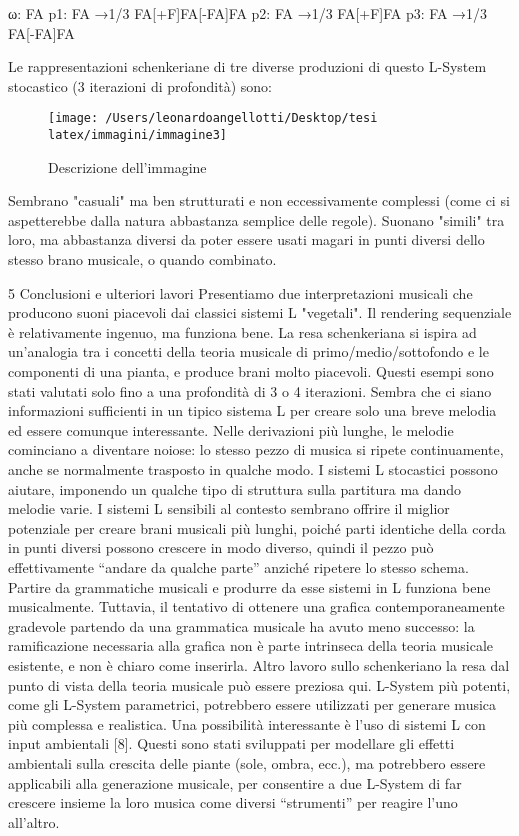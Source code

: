 \documentclass[a4paper,12pt]{report}
\begin{document}
ω: FA 
p1: FA →1/3 FA[+F]FA[-FA]FA 
p2: FA →1/3 FA[+F]FA 
p3: FA →1/3 FA[-FA]FA

Le rappresentazioni schenkeriane di tre diverse produzioni di questo L-System stocastico (3 iterazioni di profondità) sono:

\begin{figure}[h!]
    \centering
    \texttt{[image: /Users/leonardoangellotti/Desktop/tesi latex/immagini/immagine3]} %
    \caption{Descrizione dell'immagine}
    \label{fig:immagine}
\end{figure}

Sembrano "casuali" ma ben strutturati e non eccessivamente complessi (come ci si aspetterebbe dalla natura abbastanza semplice delle regole). 
Suonano "simili" tra loro, ma abbastanza diversi da poter essere usati magari in punti diversi dello stesso brano musicale, o quando combinato.

5 Conclusioni e ulteriori lavori
Presentiamo due interpretazioni musicali che producono suoni piacevoli dai classici sistemi L "vegetali". 
Il rendering sequenziale è relativamente ingenuo, ma funziona bene. 
La resa schenkeriana si ispira ad un'analogia tra i concetti della teoria musicale di primo/medio/sottofondo e le componenti di una pianta, e produce brani molto piacevoli.
Questi esempi sono stati valutati solo fino a una profondità di 3 o 4 iterazioni. 
Sembra che ci siano informazioni sufficienti in un tipico sistema L per creare solo una breve melodia ed essere comunque interessante. 
Nelle derivazioni più lunghe, le melodie cominciano a diventare noiose: lo stesso pezzo di musica si ripete continuamente, anche se normalmente trasposto in qualche modo. 
I sistemi L stocastici possono aiutare, imponendo un qualche tipo di struttura sulla partitura ma dando melodie varie. 
I sistemi L sensibili al contesto sembrano offrire il miglior potenziale per creare brani musicali più lunghi, poiché parti identiche della corda in punti diversi possono crescere in modo diverso, quindi il pezzo può effettivamente “andare da qualche parte” anziché ripetere lo stesso schema.
Partire da grammatiche musicali e produrre da esse sistemi in L funziona bene musicalmente. 
Tuttavia, il tentativo di ottenere una grafica contemporaneamente gradevole partendo da una grammatica musicale ha avuto meno successo: la ramificazione necessaria alla grafica non è parte intrinseca della teoria musicale esistente, e non è chiaro come inserirla. Altro lavoro sullo schenkeriano la resa dal punto di vista della teoria musicale può essere preziosa qui.
L-System più potenti, come gli L-System parametrici, potrebbero essere utilizzati per generare musica più complessa e realistica. Una possibilità interessante è l'uso di sistemi L con input ambientali [8]. 
Questi sono stati sviluppati per modellare gli effetti ambientali sulla crescita delle piante (sole, ombra, ecc.), ma potrebbero essere applicabili alla generazione musicale, per consentire a due L-System di far crescere insieme la loro musica come diversi “strumenti” per reagire l’uno all’altro.
\end{document}
